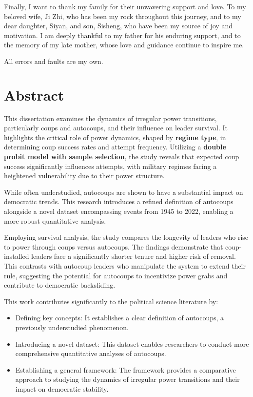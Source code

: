 \documentclass[
  12pt,
]{report}
\begin{document}
Finally, I want to thank my family for their unwavering support and
love. To my beloved wife, Ji Zhi, who has been my rock throughout this
journey, and to my dear daughter, Siyan, and son, Sisheng, who have been
my source of joy and motivation. I am deeply thankful to my father for
his enduring support, and to the memory of my late mother, whose love
and guidance continue to inspire me.

All errors and faults are my own.

\chapter*{Abstract}\label{abstract}

This dissertation examines the dynamics of irregular power transitions,
particularly coups and autocoups, and their influence on leader
survival. It highlights the critical role of power dynamics, shaped by
\textbf{regime type}, in determining coup success rates and attempt
frequency. Utilizing a \textbf{double probit model with sample
selection}, the study reveals that expected coup success significantly
influences attempts, with military regimes facing a heightened
vulnerability due to their power structure.

While often understudied, autocoups are shown to have a substantial
impact on democratic trends. This research introduces a refined
definition of autocoups alongside a novel dataset encompassing events
from 1945 to 2022, enabling a more robust quantitative analysis.

Employing survival analysis, the study compares the longevity of leaders
who rise to power through coups versus autocoups. The findings
demonstrate that coup-installed leaders face a significantly shorter
tenure and higher risk of removal. This contrasts with autocoup leaders
who manipulate the system to extend their rule, suggesting the potential
for autocoups to incentivize power grabs and contribute to democratic
backsliding.

This work contributes significantly to the political science literature
by:

\begin{itemize}
\item
  Defining key concepts: It establishes a clear definition of autocoups,
  a previously understudied phenomenon.
\item
  Introducing a novel dataset: This dataset enables researchers to
  conduct more comprehensive quantitative analyses of autocoups.
\item
  Establishing a general framework: The framework provides a comparative
  approach to studying the dynamics of irregular power transitions and
  their impact on democratic stability.
\end{itemize}
\end{document}
